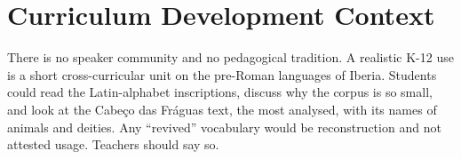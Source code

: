\documentclass[12pt]{article}
\begin{document}
\section{Curriculum Development Context}
There is no speaker community and no pedagogical tradition. A realistic K-12 use is a short cross-curricular unit on the pre-Roman languages of Iberia. Students could read the Latin-alphabet inscriptions, discuss why the corpus is so small, and look at the Cabeço das Fráguas text, the most analysed, with its names of animals and deities. Any ``revived'' vocabulary would be reconstruction and not attested usage. Teachers should say so.
\end{document}
